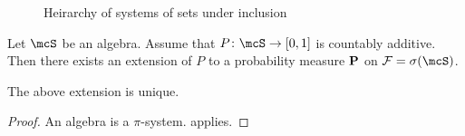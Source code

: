 \begin{figure}
    \centering
    \caption{Heirarchy of systems of sets under inclusion}
    \label{fig:systems}
\end{figure}

\begin{theorem*} \label{thm:caratheodory}
    Let $\mcS$ be an algebra.
    Assume that $P\colon \mcS \to [0, 1]$ is countably additive.
    Then there exists an extension of $P$ to a probability measure
    $\P$ on $\F = \sigma(\mcS)$.
\end{theorem*}

\begin{corollary*}
    The above extension is unique.
\end{corollary*}
\begin{proof}
    An algebra is a $\pi$-system.
     applies.
\end{proof}

